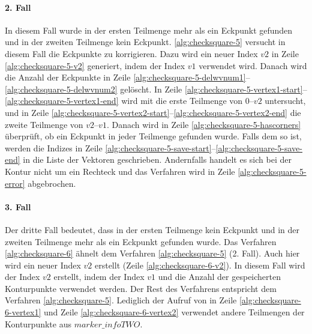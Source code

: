 


\paragraph{2. Fall} %
\label{par:2_fall}

In diesem Fall wurde in der ersten Teilmenge mehr als ein Eckpunkt gefunden und in der zweiten Teilmenge kein Eckpunkt.
 \autoref{alg:checksquare-5} versucht in diesem Fall die Eckpunkte zu korrigieren. Dazu wird ein neuer Index
 $\mathit{v2}$ in Zeile \ref{alg:checksquare-5-v2} generiert, indem der Index $\mathit{v1}$ verwendet wird. Danach wird
 die Anzahl der Eckpunkte in Zeile \ref{alg:checksquare-5-delwvnum1}--\ref{alg:checksquare-5-delwvnum2} gelöscht. In
 Zeile \ref{alg:checksquare-5-vertex1-start}--\ref{alg:checksquare-5-vertex1-end} wird mit  die
 erste Teilmenge von $0$--$\mathit{v2}$ untersucht, und in Zeile
 \ref{alg:checksquare-5-vertex2-start}--\ref{alg:checksquare-5-vertex2-end} die zweite Teilmenge von
 $\mathit{v2}$--$\mathit{v1}$. Danach wird in Zeile \ref{alg:checksquare-5-hascorners} überprüft, ob ein Eckpunkt in
 jeder Teilmenge gefunden wurde. Falls dem so ist, werden die Indizes in Zeile
 \ref{alg:checksquare-5-save-start}--\ref{alg:checksquare-5-save-end} in die Liste der Vektoren geschrieben. Andernfalls
 handelt es sich bei der Kontur nicht um ein Rechteck und das Verfahren wird in Zeile \ref{alg:checksquare-5-error}
 abgebrochen.




\paragraph{3. Fall} %
\label{par:3_fall}

Der dritte Fall bedeutet, dass in der ersten Teilmenge kein Eckpunkt und in der zweiten Teilmenge mehr als ein Eckpunkt
 gefunden wurde. Das Verfahren \autoref{alg:checksquare-6} ähnelt dem Verfahren \autoref{alg:checksquare-5} (2. Fall).
 Auch hier wird ein neuer Index $\mathit{v2}$ erstellt (Zeile \ref{alg:checksquare-6-v2}). In diesem Fall wird der
 Index $\mathit{v2}$ erstellt, indem der Index $\mathit{v1}$ und die Anzahl der gespeicherten Konturpunkte verwendet
 werden. Der Rest des Verfahrens entspricht dem Verfahren \autoref{alg:checksquare-5}. Lediglich der Aufruf von
  in Zeile \ref{alg:checksquare-6-vertex1} und Zeile \ref{alg:checksquare-6-vertex2} verwendet
 andere Teilmengen der Konturpunkte aus $\mathit{marker\_infoTWO}$.

